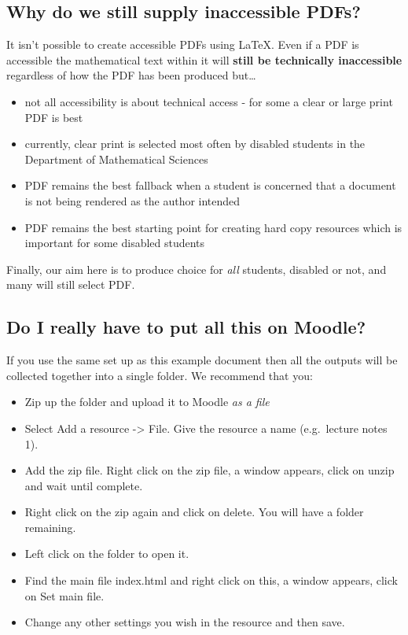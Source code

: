 \documentclass[
  12pt,
  a4paper]{extarticle}
\providecommand{\tightlist}{%
  \setlength{\itemsep}{0pt}\setlength{\parskip}{0pt}}
\theoremstyle{plain}
\theoremstyle{definition}
\theoremstyle{plain}
\theoremstyle{plain}
\theoremstyle{plain}
\theoremstyle{plain}
\theoremstyle{definition}
\theoremstyle{definition}
\theoremstyle{remark}
\theoremstyle{remark}
\renewcommand{\;}{\,}
\begin{document}
\hypertarget{why-do-we-still-supply-inaccessible-pdfs}{%
\subsection{Why do we still supply inaccessible PDFs?}\label{why-do-we-still-supply-inaccessible-pdfs}}

It isn't possible to create accessible PDFs using LaTeX. Even if a PDF is accessible the mathematical text within it will \textbf{still be technically inaccessible} regardless of how the PDF has been produced but\ldots{}

\begin{itemize}
\tightlist
\item
  not all accessibility is about technical access - for some a clear or large print PDF is best
\item
  currently, clear print is selected most often by disabled students in the Department of Mathematical Sciences
\item
  PDF remains the best fallback when a student is concerned that a document is not being rendered as the author intended
\item
  PDF remains the best starting point for creating hard copy resources which is important for some disabled students
\end{itemize}

Finally, our aim here is to produce choice for \emph{all} students, disabled or not, and many will still select PDF.

\hypertarget{do-i-really-have-to-put-all-this-on-moodle}{%
\subsection{Do I really have to put all this on Moodle?}\label{do-i-really-have-to-put-all-this-on-moodle}}

If you use the same set up as this example document then all the outputs will be collected together into a single folder. We recommend that you:

\begin{itemize}
\tightlist
\item
  Zip up the folder and upload it to Moodle \emph{as a file}
\item
  Select Add a resource -\textgreater{} File. Give the resource a name (e.g.~lecture notes 1).
\item
  Add the zip file. Right click on the zip file, a window appears, click on unzip and wait until complete.
\item
  Right click on the zip again and click on delete. You will have a folder remaining.
\item
  Left click on the folder to open it.
\item
  Find the main file index.html and right click on this,
  a window appears, click on Set main file.
\item
  Change any other settings you wish in the resource and then save.
\end{itemize}
\end{document}
